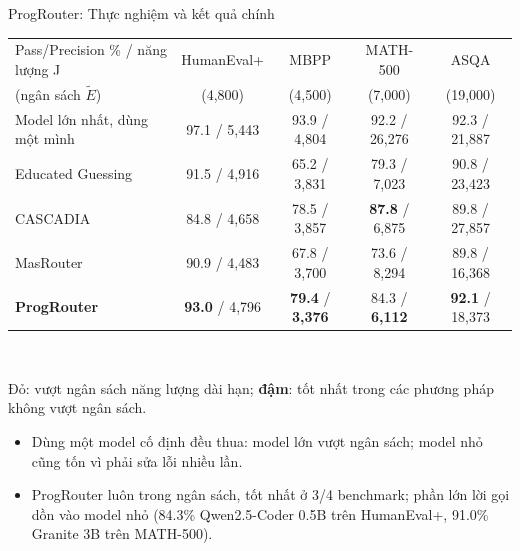 \documentclass[aspectratio=169,10pt]{beamer}
\begin{document}
\begin{frame}{ProgRouter: Thực nghiệm và kết quả chính}
  \vspace{3pt}
  \centering
  \scriptsize
  \begin{tabular}{@{}l c c c c@{}}
    \toprule
    Pass/Precision \% / năng lượng J & HumanEval+ & MBPP & MATH-500 & ASQA \\
    \quad (ngân sách $\tilde E$) & (4,800) & (4,500) & (7,000) & (19,000) \\
    \midrule
    Model lớn nhất, dùng một mình & 97.1 / \alert{5,443} & 93.9 / \alert{4,804} & 92.2 / \alert{26,276} & 92.3 / \alert{21,887} \\
    Educated Guessing & 91.5 / \alert{4,916} & 65.2 / 3,831 & 79.3 / \alert{7,023} & 90.8 / \alert{23,423} \\
    CASCADIA          & 84.8 / 4,658 & 78.5 / 3,857 & \textbf{87.8} / 6,875 & 89.8 / \alert{27,857} \\
    MasRouter         & 90.9 / 4,483 & 67.8 / 3,700 & 73.6 / \alert{8,294} & 89.8 / 16,368 \\
    \textbf{ProgRouter} & \textbf{93.0} / 4,796 & \textbf{79.4} / \textbf{3,376} & 84.3 / \textbf{6,112} & \textbf{92.1} / 18,373 \\
    \bottomrule
  \end{tabular}\\[2pt]
  {\scriptsize \alert{Đỏ}: vượt ngân sách năng lượng dài hạn; \textbf{đậm}: tốt nhất trong các phương pháp không vượt ngân sách.\par}
  \vspace{2pt}
  \raggedright\footnotesize
  \begin{itemize}
    \item Dùng một model cố định đều thua: model lớn vượt ngân sách; model nhỏ cũng tốn vì phải sửa lỗi nhiều lần.
    \item ProgRouter luôn trong ngân sách, tốt nhất ở 3/4 benchmark; phần lớn lời gọi dồn vào model nhỏ
      (84.3\% Qwen2.5-Coder 0.5B trên HumanEval+, 91.0\% Granite 3B trên MATH-500).
  \end{itemize}
\end{frame}
\end{document}
